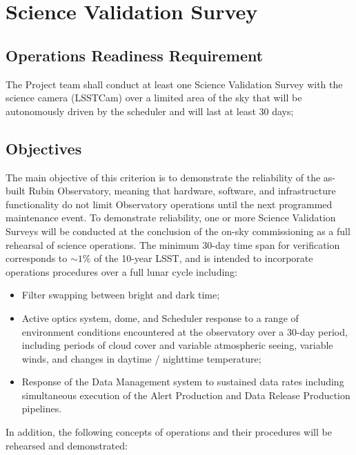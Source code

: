 \section{Science Validation Survey}  \label{sec:svs}

\subsection{Operations Readiness Requirement}

The Project team shall conduct at least one Science Validation Survey with the science camera (LSSTCam) over a limited area of the sky that will be autonomously driven by the scheduler and will last at least 30 days;

\subsection{Objectives}

The main objective of this criterion is to demonstrate the reliability of the as-built Rubin Observatory, meaning that hardware, software, and infrastructure functionality do not limit Observatory operations until the next programmed maintenance event.
To demonstrate reliability, one or more Science Validation Surveys will be conducted at the conclusion of the on-sky commissioning as a full rehearsal of science operations. The minimum 30-day time span for verification corresponds to $\sim 1\%$ of the 10-year LSST, and is intended to incorporate operations procedures over a full lunar cycle including:

\begin{itemize}
\item Filter swapping between bright and dark time;
\item Active optics system, dome, and Scheduler response to a range of environment conditions encountered at the observatory over a 30-day period, including periods of cloud cover and variable atmospheric seeing, variable winds, and changes in daytime / nighttime temperature;
\item Response of the Data Management system to sustained data rates including simultaneous execution of the Alert Production and Data Release Production pipelines.
\end{itemize}

In addition, the following concepts of operations and their procedures will be rehearsed and demonstrated:

